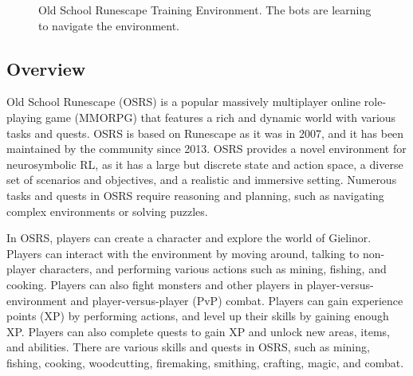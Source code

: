 \documentclass{article}
\begin{document}
\begin{figure}[h]
  
  \centering
  
  \caption{Old School Runescape Training Environment. The bots are learning to navigate the environment.}
\end{figure}


\subsection{Overview}



Old School Runescape (OSRS) is a popular massively multiplayer online role-playing game (MMORPG) that features a rich and dynamic world with various tasks and quests. OSRS is based on Runescape as it was in 2007, and it has been maintained by the community since 2013. OSRS provides a novel environment for neurosymbolic RL, as it has a large but discrete state and action space, a diverse set of scenarios and objectives, and a realistic and immersive setting. Numerous tasks and quests in OSRS require reasoning and planning, such as navigating complex environments or solving puzzles.

In OSRS, players can create a character and explore the world of Gielinor. Players can interact with the environment by moving around, talking to non-player characters, and performing various actions such as mining, fishing, and cooking. Players can also fight monsters and other players in player-versus-environment and player-versus-player (PvP) combat. Players can gain experience points (XP) by performing actions, and level up their skills by gaining enough XP. Players can also complete quests to gain XP and unlock new areas, items, and abilities. There are various skills and quests in OSRS, such as mining, fishing, cooking, woodcutting, firemaking, smithing, crafting, magic, and combat.
\end{document}
